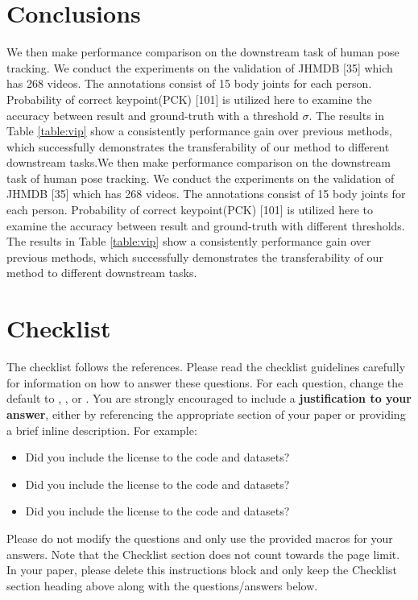 \documentclass{article}
\begin{document}
\section{Conclusions}
We then make performance comparison on the downstream task of human pose tracking. We conduct the experiments on the validation of JHMDB [35] which has 268 videos. The annotations consist of 15 body joints for each person. Probability of correct keypoint(PCK) [101] is utilized here to examine the accuracy between result and  ground-truth with a threshold $\sigma $. The results in Table \ref{table:vip} show a consistently performance gain over previous methods, which successfully demonstrates the transferability of our method to different downstream tasks.We then make performance comparison on the downstream task of human pose tracking. We conduct the experiments on the validation of JHMDB [35] which has 268 videos. The annotations consist of 15 body joints for each person. Probability of correct keypoint(PCK) [101] is utilized here to examine the accuracy between result and  ground-truth with different thresholds. The results in Table \ref{table:vip} show a consistently performance gain over previous methods, which successfully demonstrates the transferability of our method to different downstream tasks.


\medskip


{
\small



}
% 
% 


\section*{Checklist}


The checklist follows the references.  Please
read the checklist guidelines carefully for information on how to answer these
questions.  For each question, change the default \answerTODO{} to \answerYes{},
\answerNo{}, or \answerNA{}.  You are strongly encouraged to include a {\bf
justification to your answer}, either by referencing the appropriate section of
your paper or providing a brief inline description.  For example:
\begin{itemize}
  \item Did you include the license to the code and datasets? \answerYes
  \item Did you include the license to the code and datasets? 
  \item Did you include the license to the code and datasets? \answerNA{}
\end{itemize}
Please do not modify the questions and only use the provided macros for your
answers.  Note that the Checklist section does not count towards the page
limit.  In your paper, please delete this instructions block and only keep the
Checklist section heading above along with the questions/answers below.
\end{document}
